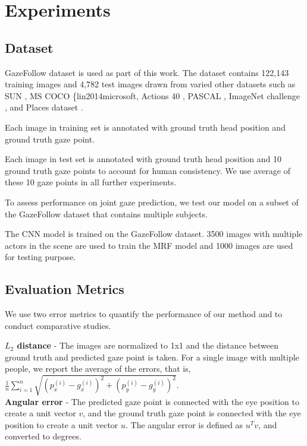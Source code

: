 \documentclass[10pt,twocolumn,letterpaper]{article}
\begin{document}
\section{Experiments}

\subsection{Dataset}

GazeFollow dataset \cite{nips15_recasens} is used as part of this work. The dataset contains 122,143 training images and 4,782 test images drawn from varied other datasets such as SUN \cite{xiao2010sun}, MS COCO \{lin2014microsoft, Actions 40 \cite{yao2011human}, PASCAL \cite{everingham2010pascal}, ImageNet challenge \cite{russakovsky2015imagenet}, and Places dataset \cite{zhou2014learning}.

Each image in training set is annotated with ground truth head position and ground truth gaze point.

Each image in test set is annotated with ground truth head position and 10 ground truth gaze points to account for human consistency. We use average of these 10 gaze points in all further experiments.

To assess performance on joint gaze prediction, we test our model on a subset of the GazeFollow dataset that contains multiple subjects.

The CNN model \cite{nips15_recasens} is trained on the GazeFollow dataset. 3500 images with multiple actors in the scene are used to train the MRF model and 1000 images are used for testing purpose.

\subsection{Evaluation Metrics}

We use two error metrics to quantify the performance of our method and to conduct comparative studies.

\textbf{$L_2$ distance} - The images are normalized to 1x1 and the distance between ground truth and predicted gaze point is taken. For a single image with multiple people, we report the average of the errors, that is, $\frac{1}{n} \sum_{i=1}^n \sqrt{(p_x^{(i)} - g_x^{(i)})^2 + (p_y^{(i)} - g_y^{(i)})^2}$. \\

\textbf{Angular error} - The predicted gaze point is connected with the eye position to create a unit vector $v$, and the ground truth gaze point is connected with the eye position to create a unit vector $u$. The angular error is defined as $u^T v$, and converted to degrees.
\end{document}
